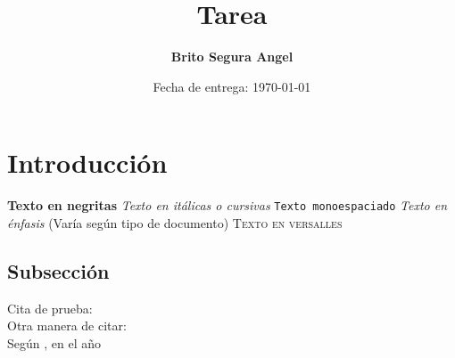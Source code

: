 \documentclass[letterpaper,10.5pt]{article} %
\title{Tarea }
\author{\textbf{Brito Segura Angel}}
\date{Fecha de entrega: \today}
\begin{document}
    \pagestyle{fancy} %
    \maketitle %
    
    
    \section{Introducción}
	    \textbf{Texto en negritas} \newline
		\textit{Texto en itálicas o cursivas} \newline
		\texttt{Texto monoespaciado} \newline
		\emph{Texto en énfasis} (Varía según tipo de documento) \newline
		\textsc{Texto en versalles} \newline

    \subsection{Subsección}
	    Cita de prueba: \cite{libro}\\ %

		Otra manera de citar: \citet{sitio_web}\\ %

		Según \citeauthor{cursos_materias}, %
		en el año \citeyear{cursos_materias}\\ %

	\hfill \break %
	
\end{document}
